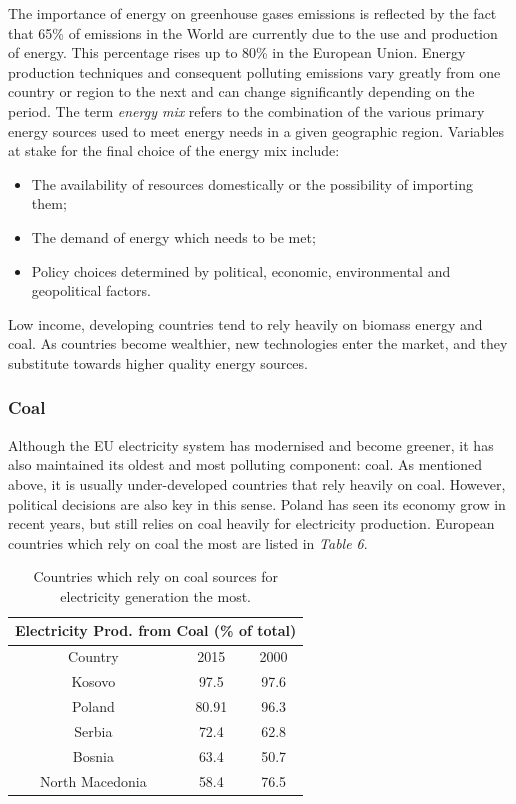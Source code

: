 \documentclass{book}
\begin{document}
The importance of energy on greenhouse gases emissions is reflected by the fact that 65\% of emissions in the World are currently due to the use and production of energy. This percentage rises up to 80\% in the European Union.\cite{marrero2010greenhouse} Energy production techniques and consequent polluting emissions vary greatly from one country or region to the next and can change significantly depending on the period. The term \textit{energy mix} refers to the combination of the various primary energy sources used to meet energy needs in a given geographic region. Variables at stake for the final choice of the energy mix include:

\begin{itemize}

\item The availability of resources domestically or the possibility of importing them;
\item The demand of energy which needs to be met;
\item Policy choices determined by political, economic, environmental and geopolitical factors.

\end{itemize}

Low income, developing countries tend to rely heavily on biomass energy and coal. \cite{international2009energy} As countries become wealthier, new technologies enter the market, and they substitute towards higher quality energy sources. \cite{csereklyei2016energy}

\subsubsection*{Coal}

Although the EU electricity system has modernised and become greener, it has also maintained its oldest and most polluting component: coal. As mentioned above, it is usually under-developed countries that rely heavily on coal. However, political decisions are also key in this sense. Poland has seen its economy grow in recent years, but still relies on coal heavily for electricity production. European countries which rely on coal the most are listed in \textit{Table 6}.

\bigskip
\begin{table}[H]
\begin{center}
\begin{tabular}{|c|c|c|}
\hline
\multicolumn{3}{|c|}{Electricity Prod. from Coal (\% of total)}\\
\hline
Country & 2015 & 2000 \\
\hline
Kosovo & 97.5 & 97.6\\
Poland & 80.91 & 96.3 \\
Serbia & 72.4 & 62.8 \\
Bosnia & 63.4 & 50.7\\
North Macedonia & 58.4 & 76.5\\
\hline
\end{tabular}
\caption{Countries which rely on coal sources for electricity generation the most.}
\end{center}
\end{table}
\end{document}
